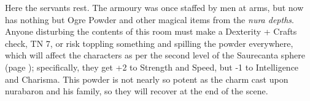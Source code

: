 Here the servants rest.  The armoury was once staffed by men at arms, but now has nothing but Ogre Powder and other magical items from the \textit{nura depths}.  Anyone disturbing the contents of this room must make a Dexterity + Crafts check, TN 7, or risk toppling something and spilling the powder everywhere, which will affect the characters as per the second level of the Saurecanta sphere (page \pageref{saurecanta}); specifically, they get +2 to Strength and Speed, but -1 to Intelligence and Charisma.  This powder is not nearly so potent as the charm cast upon \gls{nurabaron} and his family, so they will recover at the end of the scene.




